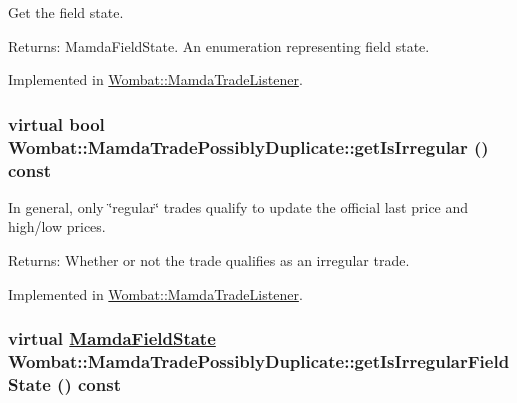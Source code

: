 Get the field state. 

\begin{Desc}
\item[Returns:]Mamda\-Field\-State. An enumeration representing field state. \end{Desc}


Implemented in \hyperlink{classWombat_1_1MamdaTradeListener_ba6a73453e3956f883f40b5ae7d127d0}{Wombat::Mamda\-Trade\-Listener}.\hypertarget{classWombat_1_1MamdaTradePossiblyDuplicate_63462036a60908fbbaf8d6a462332c35}{
\subsubsection[getIsIrregular]{\setlength{\rightskip}{0pt plus 5cm}virtual bool Wombat::Mamda\-Trade\-Possibly\-Duplicate::get\-Is\-Irregular () const}}
\label{classWombat_1_1MamdaTradePossiblyDuplicate_63462036a60908fbbaf8d6a462332c35}


In general, only \char`\"{}regular\char`\"{} trades qualify to update the official last price and high/low prices. 

\begin{Desc}
\item[Returns:]Whether or not the trade qualifies as an irregular trade. \end{Desc}


Implemented in \hyperlink{classWombat_1_1MamdaTradeListener_1a5b54d3d63c62bf8720cc29dd40b25a}{Wombat::Mamda\-Trade\-Listener}.\hypertarget{classWombat_1_1MamdaTradePossiblyDuplicate_d71ae9976fe6a0f141fb1a9d2cd60b8d}{
\subsubsection[getIsIrregularFieldState]{\setlength{\rightskip}{0pt plus 5cm}virtual \hyperlink{namespaceWombat_93aac974f2ab713554fd12a1fa3b7d2a}{Mamda\-Field\-State} Wombat::Mamda\-Trade\-Possibly\-Duplicate::get\-Is\-Irregular\-Field\-State () const}}
\label{classWombat_1_1MamdaTradePossiblyDuplicate_d71ae9976fe6a0f141fb1a9d2cd60b8d}


